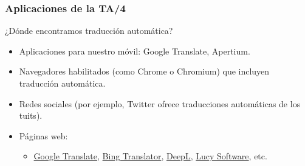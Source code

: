 \documentclass{beamer}
\begin{document}
\begin{frame}
\frametitle{Aplicaciones de la TA/4}
¿Dónde encontramos traducción automática?
\begin{itemize}
\item Aplicaciones para nuestro móvil: Google Translate, Apertium.
\item Navegadores habilitados (como Chrome o Chromium) que incluyen traducción automática.
\item Redes sociales (por ejemplo, Twitter ofrece traducciones automáticas de los tuits).
\item Páginas web:
\begin{itemize}
\item \url{Google Translate}, \url{Bing Translator}, \url{DeepL}, \url{Lucy Software}, etc.
\end{itemize}
\end{itemize}
\end{frame}
\end{document}
